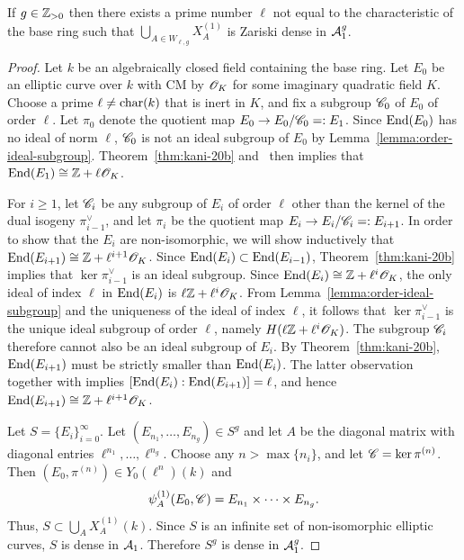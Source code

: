 \documentclass{amsart}
\begin{document}
\begin{theorem}\label{thm:curves-dense-a1}
    If $g \in \mathbb{Z}_{>0}$ then there exists a prime number $\ell$ not equal to the characteristic of the base ring such that $\bigcup_{A\in W_{\ell,g}} X^{(1)}_A$ is Zariski dense in $\mathcal{A}_1^g$.
\end{theorem}
\begin{proof}
 Let $k$ be an algebraically closed field containing the base ring. Let $E_0$ be an elliptic curve over $k$ with CM by $\mathscr{O}_K$ for some imaginary quadratic field $K$. Choose a prime $\ell\neq\operatorname{char}(k)$ that is inert in $K$, and fix a subgroup $\mathscr{C}_0$ of $E_0$ of order $\ell$. Let $\pi_0$ denote the quotient map $E_0 \to E_0/\mathscr{C}_0 =: E_1$. Since $\operatorname{End}(E_0)$ has no ideal of norm $\ell$, $\mathscr{C}_0$ is not an  ideal subgroup of $E_0$ by Lemma~\ref{lemma:order-ideal-subgroup}. Theorem~\ref{thm:kani-20b} and~\cite[Prop.~5]{kohel1996endomorphism} then implies that $\operatorname{End}(E_1) \cong \mathbb{Z} + \ell\mathscr{O}_K$.

 For $i \ge 1$, let $\mathscr{C}_i$ be any subgroup of $E_i$ of order $\ell$ other than the kernel of the dual isogeny $\pi_{i-1}^\vee$, and let $\pi_i$ be the quotient map $E_i \to E_i/\mathscr{C}_i =: E_{i+1}$. In order to show that the $E_i$ are non-isomorphic, we will show inductively that $\operatorname{End}(E_{i+1}) \cong \mathbb{Z} + \ell^{i+1}\mathscr{O}_{K}$. Since $\operatorname{End}(E_{i}) \subset \operatorname{End}(E_{i-1})$, Theorem~\ref{thm:kani-20b} implies that $\ker \pi_{i-1}^\vee$ is an ideal subgroup. Since $\operatorname{End}(E_{i}) \cong \mathbb{Z} + \ell^{i}\mathscr{O}_{K}$, the only ideal of index $\ell$ in $\operatorname{End}(E_{i})$ is $\ell\mathbb{Z} + \ell^i\mathscr{O}_K$. From Lemma~\ref{lemma:order-ideal-subgroup} and the uniqueness of the ideal of index $\ell$, it follows that $\ker \pi_{i-1}^\vee$ is the unique ideal subgroup of order $\ell$, namely $H(\ell\mathbb{Z} + \ell^i\mathscr{O}_K)$. The subgroup $\mathscr{C}_i$ therefore cannot also be an ideal subgroup of $E_i$. By Theorem~\ref{thm:kani-20b}, $\operatorname{End}(E_{i+1})$ must be strictly smaller than $\operatorname{End}(E_{i})$. The latter observation together with \cite[Prop.~5]{kohel1996endomorphism} implies $[\operatorname{End}(E_i):\operatorname{End}(E_{i+1})] = \ell$, and hence $\operatorname{End}(E_{i+1}) \cong \mathbb{Z} + \ell^{i+1}\mathscr{O}_{K}$.

  Let $S = \{E_i\}_{i=0}^\infty$. Let $(E_{n_1},\dots,E_{n_g}) \in S^g$ and let $A$ be the diagonal matrix with diagonal entries $\ell^{n_1},\dots,\ell^{n_g}$.  Choose any $n > \max\{n_i\}$, and let $\mathscr{C} = \ker \pi^{(n)}$. Then $(E_0,\pi^{(n)}) \in Y_0(\ell^n)(k)$ and
 \[
   \psi_{A}^{(1)}(E_0,\mathscr{C}) = E_{n_1} \times \cdots \times E_{n_g}.
 \]
Thus, $S \subset \bigcup_A X^{(1)}_A(k)$. Since $S$ is an infinite set of non-isomorphic elliptic curves, $S$ is dense in $\mathcal{A}_1$. Therefore $S^g$ is dense in $\mathcal{A}_1^g$.
\end{proof}
\end{document}
